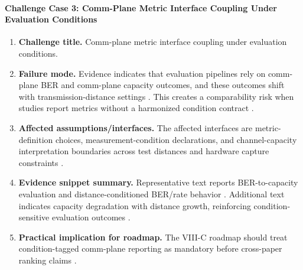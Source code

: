 \documentclass[lettersize,journal]{IEEEtran}
\begin{document}
\paragraph{Challenge Case 3: Comm-Plane Metric Interface Coupling Under Evaluation Conditions}
\begin{enumerate}
    \item \textbf{Challenge title.} Comm-plane metric interface coupling under evaluation conditions.
    \item \textbf{Failure mode.} Evidence indicates that evaluation pipelines rely on comm-plane BER and comm-plane capacity outcomes, and these outcomes shift with transmission-distance settings \cite{O_ISAC_381}. This creates a comparability risk when studies report metrics without a harmonized condition contract \cite{O_ISAC_381}.
    \item \textbf{Affected assumptions/interfaces.} The affected interfaces are metric-definition choices, measurement-condition declarations, and channel-capacity interpretation boundaries across test distances and hardware capture constraints \cite{O_ISAC_381}.
    \item \textbf{Evidence snippet summary.} Representative text reports BER-to-capacity evaluation and distance-conditioned BER/rate behavior \cite{O_ISAC_381}. Additional text indicates capacity degradation with distance growth, reinforcing condition-sensitive evaluation outcomes \cite{O_ISAC_381}.
    \item \textbf{Practical implication for roadmap.} The VIII-C roadmap should treat condition-tagged comm-plane reporting as mandatory before cross-paper ranking claims \cite{O_ISAC_381}.
\end{enumerate}
\end{document}
